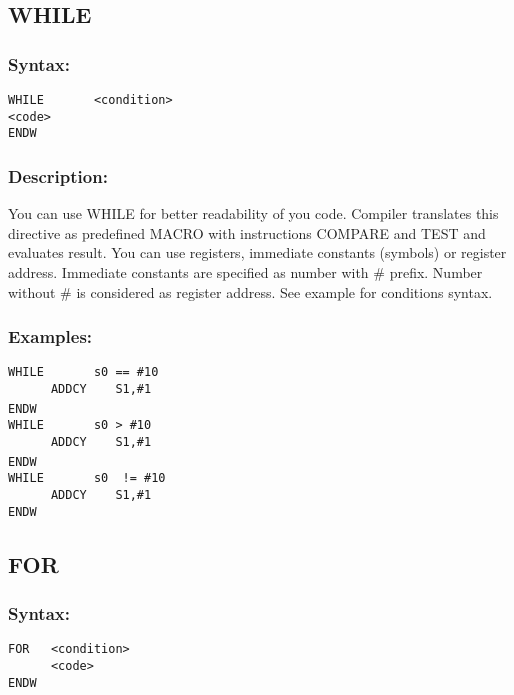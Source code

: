     \subsection{WHILE}
        \subsubsection{Syntax:}
            {
                \usecodefont
                \verb'WHILE       <condition>'\\
                \verb'<code>'\\
                \verb'ENDW'
            }

        \subsubsection{Description:}
            You can use WHILE for better readability of you code. Compiler translates this directive as predefined MACRO with instructions COMPARE and TEST and evaluates result. You can use registers, immediate constants (symbols) or register address. Immediate constants are specified as number with \# prefix. Number without \# is considered as register address. See example for conditions syntax.

        \subsubsection{Examples:}
            {
                \usecodefont
                \verb'WHILE       s0 == #10'\\
                \verb'      ADDCY    S1,#1'\\
                \verb'ENDW'
                ~\\
                \usecodefont
                \verb'WHILE       s0 > #10'\\
                \verb'      ADDCY    S1,#1'\\
                \verb'ENDW'
                ~\\
                \usecodefont
                \verb'WHILE       s0  != #10'\\
                \verb'      ADDCY    S1,#1'\\
                \verb'ENDW'
            }

    \subsection{FOR}
        \subsubsection{Syntax:}
            {
                \usecodefont
                \verb'FOR   <condition>'\\
                \verb'      <code>'\\
                \verb'ENDW'
            }

